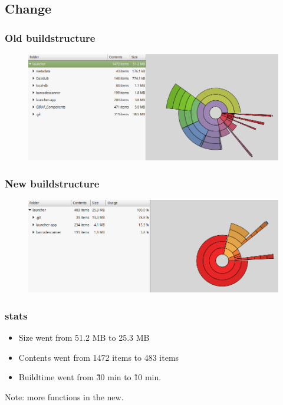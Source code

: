 \subsection{Change}
\begin{frame}
	\frametitle{Old buildstructure}
	\begin{figure}[H]
			\centering
			\includegraphics[width= 0.8 \textwidth]{pictures/StatsOld.png}
	\end{figure}
\end{frame}
\begin{frame}
	\frametitle{New buildstructure}
	\begin{figure}[H]
				\centering
				\includegraphics[width= 0.8 \textwidth]{pictures/StatsNew.png}
	\end{figure}
\end{frame}
\begin{frame}
	\frametitle{stats}
	\begin{itemize}
		\item Size went from 51.2 MB  to 25.3 MB 
		\item Contents went from 1472 items to 	483	items
		\item Buildtime went from \~30 min to \~10 min.	
	\end{itemize}
	Note: more functions in the new.
\end{frame}


